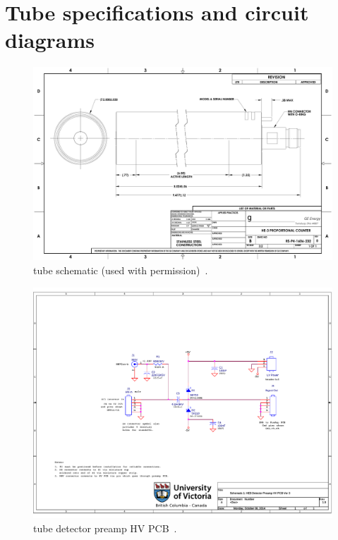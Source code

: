 \chapter{\He Tube specifications and circuit diagrams}
\label{chap:he3spec}

\begin{figure}
	\centering
		\includegraphics[width=\paperwidth]{images/He3Schematic}
	\caption[\He tube schematic]{\He tube schematic (used with permission)~\cite{GEREUTER}.}
	\label{fig:he3spec}
\end{figure}

\begin{figure}
	\centering
		\includegraphics[width=\paperwidth]{images/PCB}
	\caption[\He tube detector preamp HV PCB]{\He tube detector preamp HV PCB~\cite{Honkanen}.}
	\label{fig:he3HVPCB}
\end{figure}


